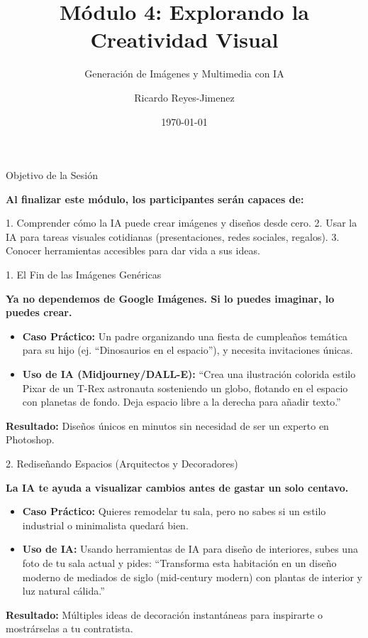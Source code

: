 \documentclass[aspectratio=169]{beamer}
\title[Módulo 4: Explorando la Creati]{Módulo 4: Explorando la Creatividad Visual}
\subtitle{Generación de Imágenes y Multimedia con IA}
\author{Ricardo Reyes-Jimenez}
\institute{IA para Todos}
\date{\today}
\begin{document}
\begin{frame}
  \titlepage
\end{frame}

\usebackgroundtemplate{}



\begin{frame}[fragile]{Objetivo de la Sesión}


\textbf{Al finalizar este módulo, los participantes serán capaces de:}

1. Comprender cómo la IA puede crear imágenes y diseños desde cero.
2. Usar la IA para tareas visuales cotidianas (presentaciones, redes sociales, regalos).
3. Conocer herramientas accesibles para dar vida a sus ideas.

\end{frame}



\begin{frame}[fragile]{1. El Fin de las Imágenes Genéricas}


\textbf{Ya no dependemos de Google Imágenes. Si lo puedes imaginar, lo puedes crear.}

\begin{itemize}
  \item \textbf{Caso Práctico:} Un padre organizando una fiesta de cumpleaños temática para su hijo (ej. ``Dinosaurios en el espacio''), y necesita invitaciones únicas.
  \item \textbf{Uso de IA (Midjourney/DALL-E):} ``Crea una ilustración colorida estilo Pixar de un T-Rex astronauta sosteniendo un globo, flotando en el espacio con planetas de fondo. Deja espacio libre a la derecha para añadir texto.''
\end{itemize}
\textbf{Resultado:} Diseños únicos en minutos sin necesidad de ser un experto en Photoshop.

\end{frame}



\begin{frame}[fragile]{2. Rediseñando Espacios (Arquitectos y Decoradores)}


\textbf{La IA te ayuda a visualizar cambios antes de gastar un solo centavo.}

\begin{itemize}
  \item \textbf{Caso Práctico:} Quieres remodelar tu sala, pero no sabes si un estilo industrial o minimalista quedará bien.
  \item \textbf{Uso de IA:} Usando herramientas de IA para diseño de interiores, subes una foto de tu sala actual y pides: ``Transforma esta habitación en un diseño moderno de mediados de siglo (mid-century modern) con plantas de interior y luz natural cálida.''
\end{itemize}
\textbf{Resultado:} Múltiples ideas de decoración instantáneas para inspirarte o mostrárselas a tu contratista.

\end{frame}
\end{document}

